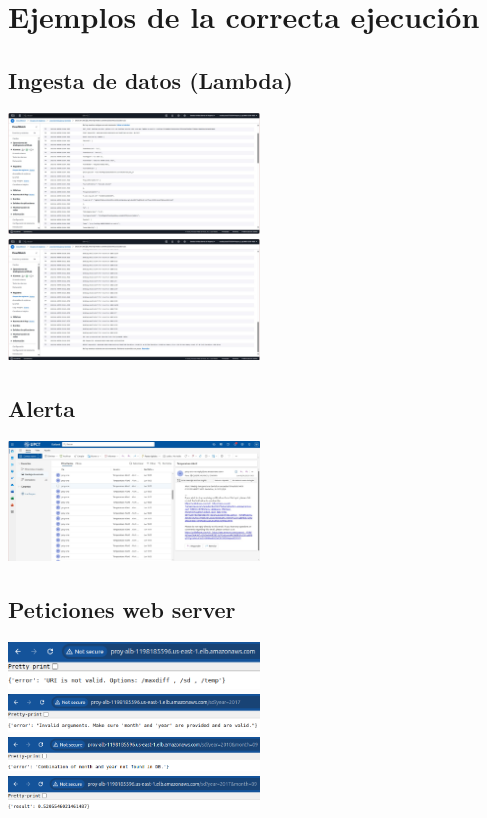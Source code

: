 \section{Ejemplos de la correcta ejecución}

\subsection{Ingesta de datos (Lambda)}

\begin{center}
     \includegraphics[width=0.5\textwidth]{img/ingesta1.jpeg}
     \includegraphics[width=0.5\textwidth]{img/ingesta2.jpeg}
\end{center}

\subsection{Alerta}

\begin{center}
     \includegraphics[width=0.5\textwidth]{img/alerta.jpeg}
\end{center}

\subsection{Peticiones web server}

\begin{center}
     \includegraphics[width=0.5\textwidth]{img/noURI.png}
     \includegraphics[width=0.5\textwidth]{img/notValidArguments.png}
     \includegraphics[width=0.5\textwidth]{img/dataNotFound.png}
     \includegraphics[width=0.5\textwidth]{img/validArguments.png}
\end{center}
